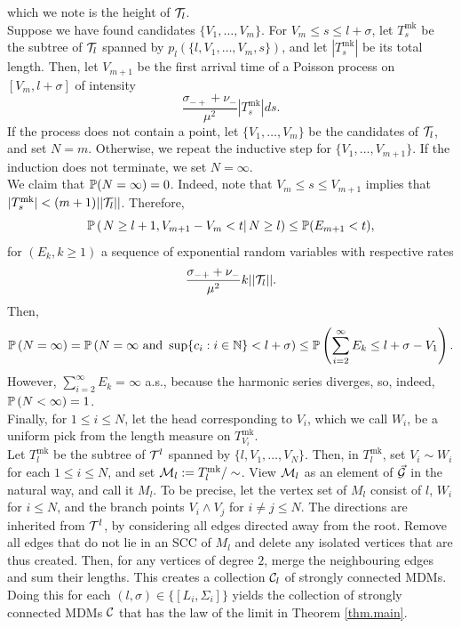 which we note is the height of $\cT_l$. \\
Suppose we have found candidates $\{V_1,\dots,V_m\}$. For $V_m\leq s\leq l+\sigma$, let $T^{\text{mk}}_s$ be the subtree of $\cT_l$ spanned by $p_l\left(\{l,V_1,\dots,V_m,s\}\right)$, and let $|T^{\text{mk}}_s|$ be its total length. Then, let $V_{m+1}$ be the first arrival time of a Poisson process on $[V_m,l+\sigma]$ of intensity $$\frac{\sigma_{-+}+\nu_-}{\mu^2}|T^{\text{mk}}_s|ds.$$ If the process does not contain a point, let $\{V_1,\dots,V_m\}$ be the candidates of $\cT_l$, and set $N=m$. Otherwise, we repeat the inductive step for $\{V_1,\dots,V_{m+1}\}.$ If the induction does not terminate, we set $N=\infty$.\\
We claim that $\P(N=\infty)=0$. Indeed, note that $V_m\leq s\leq V_{m+1}$ implies that  $|T^{\text{mk}}_s|<(m+1)||\cT_l||$. Therefore, 
$$\P\left(\left.N\geq l+1,V_{m+1}-V_m<t \right|N\geq l\right)\leq \P(E_{m+1}<t),$$
for $(E_{k},k\geq 1)$ a sequence of exponential random variables with respective rates $$\frac{\sigma_{-+}+\nu_-}{\mu^2}k||\cT_l||.$$ 
Then,
$$\P\left(N=\infty \right)=\P\left(N=\infty\text{ and }\sup\{c_i:i\in \N\}<l+\sigma\right)\leq \P\left(\sum_{i=2}^\infty E_k\leq l+\sigma-V_1\right).$$
However, $\sum_{i=2}^\infty E_k=\infty$ a.s., because the harmonic series diverges, so, indeed, $\P\left(N<\infty \right)=1$. \\
Finally, for $1\leq i \leq N$, let the head corresponding to $V_i$, which we call $W_i$, be a uniform pick from the length measure on $T^{\text{mk}}_{V_i}$. \\
Let $T^{\text{mk}}_l$ be the subtree of $\cT^{l}$ spanned by $\{l,V_1,\dots,V_N\}$. Then, in $T^{\text{mk}}_{l}$, set $V_i\sim W_i$ for each $1\leq i\leq N$, and set $\cM_{l}:=T^{\text{mk}}_{l}/\sim$. View $\cM_{l}$ as an element of $\vec{\cG}$ in the natural way, and call it $M_l$. To be precise,  let the vertex set of $M_l$ consist of $l$, $W_i$ for $i\leq N$, and the branch points $V_i\wedge V_j$ for $i\neq j\leq N$. The directions are inherited from $\cT^l$, by considering all edges directed away from the root. Remove all edges that do not lie in an SCC of $M_{l}$ and delete any isolated vertices that are thus created. Then, for any vertices of degree $2$, merge the neighbouring edges and sum their lengths. This creates a collection $\cC_l$ of strongly connected MDMs. Doing this for each $(l,\sigma)\in \{[L_i,\Sigma_i]\}$ yields the collection of strongly connected MDMs $\cC$ that has the law of the limit in Theorem \ref{thm.main}.

